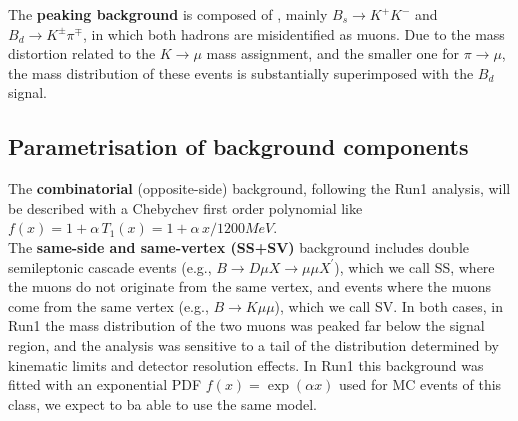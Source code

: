 The {\bf peaking background} is composed of \Bhh, mainly $B_s \to K^+K^-$ and
$B_d \to K^\pm\pi^\mp$, in which both hadrons are misidentified as muons. 
Due to the mass distortion related to the $K \to \mu$ mass assignment, and the
smaller one for $\pi \to \mu$, the mass distribution of these events is substantially
superimposed with the $B_d$ signal.







\subsection{Parametrisation of background components}
\label{sub:sec:bkg-description-2}
The {\bf combinatorial\/} (opposite-side) background, 
following the Run1 analysis, will be  described with a Chebychev
first order polynomial like $f(x) = 1 + \alpha \,T_1(x) = 1 +\alpha\, x / 1200 MeV$.\\
The  {\bf same-side and same-vertex (SS+SV)} background includes double
semileptonic cascade events (e.g., $B \to D\mu X \to \mu \mu X^\prime$),
which we call SS, where the muons do not originate from the same vertex,
and events where the muons come from the same vertex (e.g., $B \to K\mu\mu$),
which we call SV. 
In both cases, in Run1 the mass distribution of the two muons was peaked far below
the signal region, and the analysis was sensitive to a tail of the distribution
determined by kinematic limits and detector resolution effects. 
In Run1 this background was fitted with an exponential PDF $f(x) = \exp(\alpha x)$
used for MC events of this class, we expect to ba able to use the same model. \\


